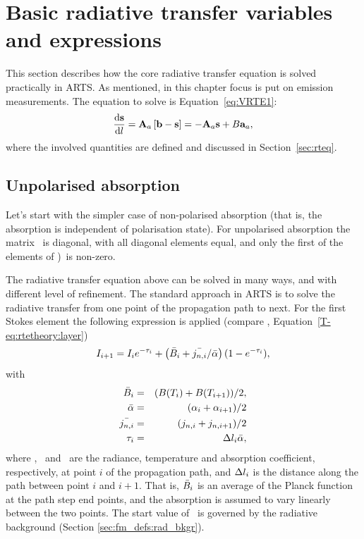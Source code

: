 \section{Basic radiative transfer variables and 
       expressions}
\label{sec:fm_defs:rte}

This section describes how the core radiative transfer equation is solved
practically in ARTS. As mentioned, in this chapter focus is put on emission
measurements. 
The equation to solve is Equation~\ref{eq:VRTE1}:
\begin{equation}
  \frac{\mathrm{d}{\bf s}}{\mathrm{d} l} = {\bf A}_{a}\left[ {\bf b}- {\bf s}
  \right] = -{\bf A}_{a}{\bf s} + B{\bf a}_{a},\nonumber
\end{equation}
where the involved quantities are defined and discussed in
Section~\ref{sec:rteq}.


\subsection{Unpolarised absorption}

Let's start with the simpler case of non-polarised absorption (that is, the
absorption is independent of polarisation state). For unpolarised absorption the
matrix \ is diagonal, with all diagonal elements equal, and only the
first of the elements of )\ is non-zero.

The radiative transfer equation above can be solved in many ways, and with
different level of refinement. The standard approach in ARTS is to solve the
radiative transfer from one point of the propagation path to next. For the
first Stokes element the following expression is applied (compare \theory,
Equation~\ref{T-eq:rtetheory:layer})
\begin{equation}
  \label{eq:fm_defs:rte_step}
  I_{i+1} = I_{i}e^{-\tau_{i}} + \left(\bar{B}_i+{\bar{j_{n,i}}}/{\bar{{\alpha}}}\right)(1-e^{-\tau_{i}}),
\end{equation}
with
\begin{eqnarray}
  \bar{B}_i &=& (B(T_{i})+B(T_{i+1}))/2, \\
  \label{eq:bbarstep}
  \bar{{\alpha}}&=&({\alpha}_{i}+{\alpha}_{i+1})/2\\
  \label{eq:absbar}
  \bar{j_{n,i}}&=&(j_{n,i}+j_{n,i+1})/2\\
  \label{eq:jnbar}
  \tau_{i} &=& \Delta l_{i}\bar{{\alpha}},  
  \label{eq:taustep}
\end{eqnarray}
where , \ and \ are the radiance, temperature and
absorption coefficient, respectively, at point $i$ of the propagation path, and
$\Delta l_{i}$ is the distance along the path between point $i$ and
$i+1$. That is, $\bar{B}_i$ is an average of the Planck function at the
path step end points, and the absorption is assumed to vary linearly between
the two points. The start value of \StoI\ is governed by the radiative
background (Section \ref{sec:fm_defs:rad_bkgr}).


